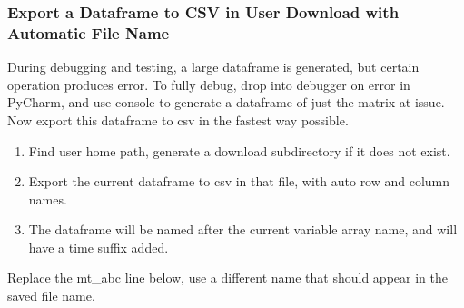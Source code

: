 \documentclass[
]{book}
\providecommand{\tightlist}{%
  \setlength{\itemsep}{0pt}\setlength{\parskip}{0pt}}
\begin{document}
\hypertarget{export-a-dataframe-to-csv-in-user-download-with-automatic-file-name}{%
\subsubsection{Export a Dataframe to CSV in User Download with Automatic File Name}\label{export-a-dataframe-to-csv-in-user-download-with-automatic-file-name}}

During debugging and testing, a large dataframe is generated, but certain operation produces error. To fully debug, drop into debugger on error in PyCharm, and use console to generate a dataframe of just the matrix at issue. Now export this dataframe to csv in the fastest way possible.

\begin{enumerate}
\def\labelenumi{\arabic{enumi}.}
\tightlist
\item
  Find user home path, generate a download subdirectory if it does not exist.
\item
  Export the current dataframe to csv in that file, with auto row and column names.
\item
  The dataframe will be named after the current variable array name, and will have a time suffix added.
\end{enumerate}

Replace the mt\_abc line below, use a different name that should appear in the saved file name.
\end{document}

